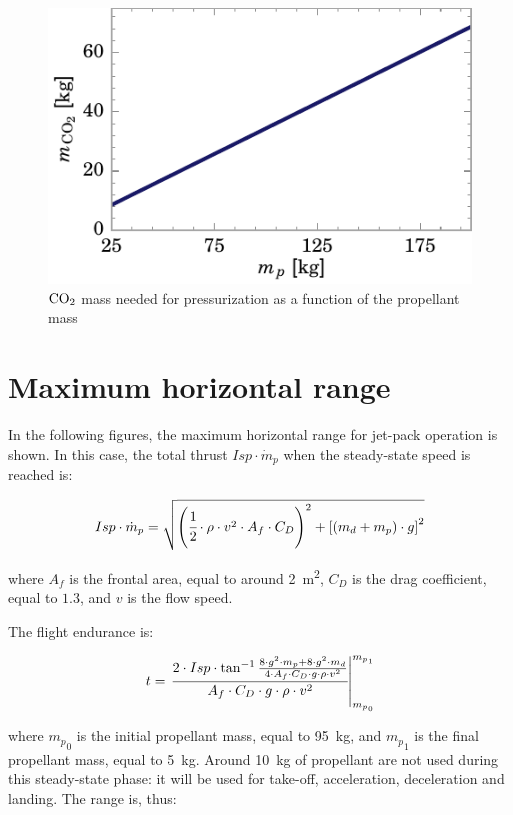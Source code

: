 \documentclass[twocolumn]{article}
\newcommand{\COtwo}{\textnormal{CO}_2}
\begin{document}
\begin{figure}[h]
  \centering
  \includegraphics{img/co2}
  \caption{$\COtwo$ mass needed for pressurization as a function of the 
propellant mass}
  \label{fig:co2}
\end{figure}


\section{Maximum horizontal range}

In the following figures, the maximum horizontal range for jet-pack operation 
is shown. In this case, the total thrust $Isp \cdot \dot{m}_p$ when the 
steady-state speed is reached is:

\begin{equation}
  Isp \cdot \dot{m}_p
  =
  \sqrt{\left(\cfrac{1}{2} \cdot \rho \cdot v^2 \cdot A_f \cdot C_D\right) ^ 2
  + \left[ \left( m_d + m_p \right) \cdot g \right] ^ 2}
\end{equation}

\noindent where $A_f$ is the frontal area, equal to around 
\SI{2}{\meter\squared}, $C_D$ is the drag coefficient, equal to $1.3$, 
and $v$ is the flow speed.

The flight endurance is:

\begin{equation}
  t = \left. \cfrac{2 \cdot Isp \cdot
  \tan^{-1}{
\frac{8 \cdot g ^ 2 \cdot m_p + 8 \cdot g ^ 2 \cdot m_d}
{4 \cdot A_f \cdot C_D \cdot g \cdot \rho \cdot v^2}
}}
  {A_f \cdot C_D \cdot g \cdot \rho \cdot v^2}
  \right|_{{m_p}_0}^{{m_p}_1}
\end{equation}

\noindent where ${m_p}_0$ is the initial propellant mass, equal to
\SI{95}{\kilogram}, and ${m_p}_1$ is the final propellant mass, equal to 
\SI{5}{\kilogram}. Around \SI{10}{\kilogram} of propellant are not used during 
this steady-state phase: it will be used for take-off, acceleration, 
deceleration and landing. The range is, thus:
\end{document}
